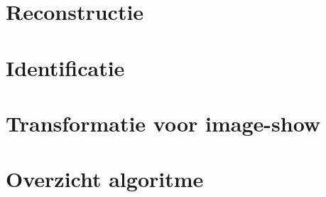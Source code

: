 \documentclass[a4paper,11pt]{article}
\begin{document}
\newpage
\section{Reconstructie}\label{sec:reconstructie}


\section{Identificatie}\label{sec:identificatie}


\newpage
\section{Transformatie voor image-show}\label{sec:transformatie}








\newpage
{}



\newpage
\appendix
\renewcommand\thefigure{\thesection.\arabic{figure}}   
\setcounter{figure}{0} 
\section{Overzicht algoritme}
\end{document}
